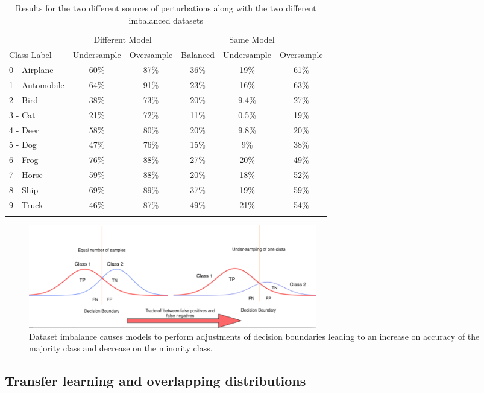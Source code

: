 \documentclass[runningheads,a4paper]{llncs}
\begin{document}
\begin{table}
	\centering
	
	\begin{tabular}{lccccc}
		\toprule
		&\multicolumn{2}{c}{Different Model}
		&\multicolumn{3}{c}{Same Model}
		\\\cmidrule(r){2-3}\cmidrule(l){4-6}
		Class Label &Undersample &Oversample &Balanced &Undersample &Oversample \\
		\midrule
		0 - Airplane &60\%& 87\% &36\%& 19\%    & 61\% \\
		1 - Automobile &64\%& 91\% &23\%& 16\%    & 63\% \\
		2 - Bird &38\%& 73\% &20\%& 9.4\%    & 27\% \\
		3 - Cat &21\%& 72\% &11\%& 0.5\%    & 19\% \\
		4 - Deer &58\%& 80\% &20\%& 9.8\%    & 20\% \\
		5 - Dog &47\%& 76\% &15\%& 9\%    & 38\% \\
		6 - Frog &76\%& 88\% &27\%& 20\%    & 49\% \\
		7 - Horse &59\%& 88\% &20\%& 18\%    & 52\% \\
		8 - Ship &69\%& 89\% &37\%& 19\%    & 59\% \\
		9 - Truck &46\%& 87\% &49\%& 21\%    & 54\% \\
		\bottomrule
		\hfill
	\end{tabular}
	\caption{Results for the two different sources of perturbations along with the two different imbalanced datasets}
	\label{tbl:results}
\end{table}
\begin{figure}
	\centering
	\includegraphics[height=4.5cm]{class_dist.png}
	\caption{Dataset imbalance causes models to perform adjustments of decision boundaries leading to an increase on accuracy of the majority class and decrease on the minority class.}
	\label{fig:class_dist}
\end{figure}

\subsection{Transfer learning and overlapping distributions}
\end{document}
